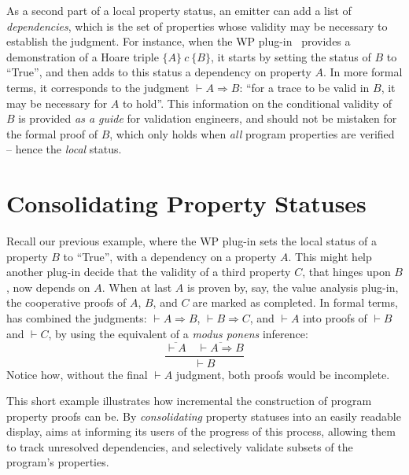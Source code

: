 As a second part of a local property status, an emitter can add a list of
\emph{dependencies}, which is the set of properties whose validity may be
necessary to establish the judgment.  For instance, when the WP
plug-in~\cite{wp} provides a demonstration of a Hoare triple $\{A\}\ c\ \{B\}$,
it starts by setting the status of $B$ to ``True'', and then adds to this
status a dependency on property $A$. In more formal terms, it corresponds to the
judgment $\vdash A\Rightarrow B$: ``for a trace to be valid in $B$, it may be
necessary for $A$ to hold''. This information on the conditional validity of
$B$ is provided \emph{as a guide} for validation engineers, and should not be
mistaken for the formal proof of $B$, which only holds when \emph{all} program
properties are verified -- hence the \emph{local} status.



\section{Consolidating Property Statuses}

Recall our previous example, where the WP plug-in sets the local status of a
property $B$ to ``True'', with a dependency on a property $A$.  This might help
another plug-in decide that the validity of a third property $C$, that hinges
upon $B$, now depends on $A$. When at last $A$ is proven by, say, the value
analysis plug-in, the cooperative proofs of $A$, $B$, and $C$ are marked as
completed. 
%
In formal terms, \FramaC has combined the judgments: $\vdash A\Rightarrow B$,
$\vdash B\Rightarrow C$, and $\vdash A$ into proofs of $\vdash B$ and $\vdash
C$, by using the equivalent of a \emph{modus ponens} inference:
$$
\frac{\overline{\vdash A} \quad \overline{\vdash A\Rightarrow B}}{\vdash B}
$$
Notice how, without the final $\vdash A$ judgment, both proofs would be incomplete.

This short example illustrates how incremental the construction of program
property proofs can be. By \emph{consolidating} property statuses into an
easily readable display, \FramaC aims at informing its users of the progress of
this process, allowing them to track unresolved dependencies, and selectively
validate subsets of the program's properties.


